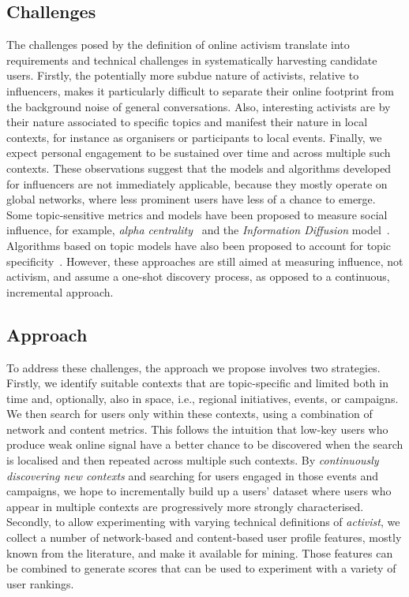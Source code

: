 \documentclass[runningheads]{llncs}
\begin{document}
\subsection{Challenges}
 
The challenges posed by the definition of online activism translate into requirements and technical challenges in systematically harvesting candidate users.
%
Firstly, the potentially more subdue nature of activists, relative to influencers, makes it particularly difficult to separate their online footprint from the background noise of general conversations.
Also, interesting activists are by their nature associated to specific topics and manifest their nature in local contexts, for instance as organisers or participants to local events. 
Finally, we expect personal engagement to be sustained over time and across multiple such contexts. 
These observations suggest that the models and algorithms developed for influencers are not immediately applicable, because they mostly operate on global networks, where less prominent users have less of a chance to emerge.
Some topic-sensitive metrics and models have been proposed to measure social influence, for example, \textit{alpha centrality}~\cite{Bonacich2001,Overbey2013} and the \textit{Information Diffusion} model~\cite{Pal2011}. Algorithms based on topic models have also been proposed to account for topic specificity~\cite{Zhao2011b}. However, these approaches are still aimed at measuring influence, not activism, and assume a one-shot discovery process, as opposed to a continuous, incremental approach.

\subsection{Approach}

To address these challenges, the approach we propose involves two strategies. 
Firstly, we identify suitable contexts that are topic-specific and limited both in time and, optionally, also in space, i.e., regional initiatives, events, or campaigns.
We then search for users only within these contexts, using a combination of network and content metrics. 
This follows the intuition that low-key users who produce weak online signal have a better chance to be discovered when the search is localised and then repeated across multiple such contexts.
By \textit{continuously discovering new contexts} and searching for users engaged in those events and campaigns, we hope to incrementally build up a users' dataset where users who appear in multiple contexts are progressively more strongly characterised.
%
Secondly, to allow experimenting with varying technical definitions of \textit{activist}, we collect a number of network-based and content-based user profile features, mostly known from the literature, and make it available for mining. Those features can be combined to generate scores that can be used to experiment with a variety of user rankings.
\end{document}
